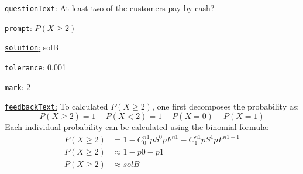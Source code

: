 \documentclass[preview]{standalone}
\newcommand \fieldname[1]{\underline{\texttt{#1}:}}
\begin{document}
\fieldname{questionText}
At least two of the customers pay by cash?

\fieldname{prompt}
$P(X \ge 2)$

\fieldname{solution}
solB

\fieldname{tolerance}
0.001

\fieldname{mark}
2

\fieldname{feedbackText}
To calculated $P(X \ge 2)$, one first decomposes the probability as:
\[
P(X \ge 2) = 1 - P(X<2) = 1 - P(X=0) - P(X=1)
\]
Each individual probability can be calculated using the binomial formula:
\[
\begin{aligned}
P(X \ge 2) &= 1 - C^{{n1}}_0 {pS}^0 {pF}^{{n1}} - C^{{n1}}_1 {pS}^1 {pF}^{{n1}-1}\\
P(X \ge 2) &\approx 1 - {p0} - {p1} \\
P(X \ge 2) &\approx {solB} \\
\end{aligned}
\]

\end{document}
